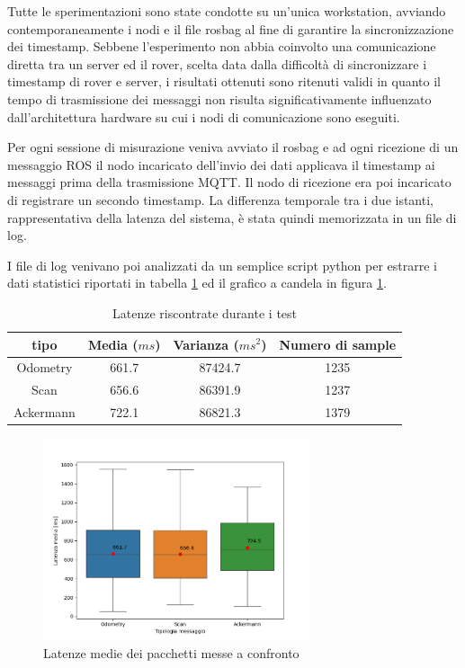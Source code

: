 \noindent Tutte le sperimentazioni sono state condotte su un'unica workstation, avviando contemporaneamente i nodi e il file rosbag al fine di garantire la sincronizzazione dei timestamp. Sebbene l'esperimento non abbia coinvolto una comunicazione diretta tra un server ed il rover, scelta data dalla difficoltà di sincronizzare i timestamp di rover e server, i risultati ottenuti sono ritenuti validi in quanto il tempo di trasmissione dei messaggi non risulta significativamente influenzato dall'architettura hardware su cui i nodi di comunicazione sono eseguiti.

\noindent Per ogni sessione di misurazione veniva avviato il rosbag e ad ogni ricezione di un messaggio ROS il nodo incaricato dell'invio dei dati applicava il timestamp ai messaggi prima della trasmissione MQTT. Il nodo di ricezione era poi incaricato di registrare un secondo timestamp. La differenza temporale tra i due istanti, rappresentativa della latenza del sistema, è stata quindi memorizzata in un file di log.

\noindent I file di log venivano poi analizzati da un semplice script python per estrarre i dati statistici riportati in tabella \ref{tabella_latenza} ed il grafico a candela in figura \ref{latency_graph}.

\begin{center}
  \begin{table}
    \centering
    \begin{tabular}{|c|c|c|c|}
    \hline
      tipo & Media ($ms$) & Varianza ($ms^2$) & Numero di sample\\ 
      \hline\hline
      Odometry & 661.7 & 87424.7 & 1235\\
      \hline
      Scan & 656.6 & 86391.9 & 1237\\
      \hline 
      Ackermann & 722.1 & 86821.3 & 1379\\ 
      \hline 
    \end{tabular}
    \caption{Latenze riscontrate durante i test}
    \label{tabella_latenza}
  \end{table}
\end{center}


\begin{figure}
    \centering
    \includegraphics[width=0.7\textwidth]{figures/grafico_latenze.png}
    \caption{Latenze medie dei pacchetti messe a confronto}
    \label{latency_graph}
\end{figure}

